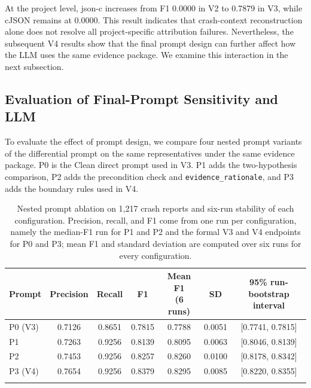 \documentclass[pdflatex,sn-basic]{sn-jnl}%
\renewcommand{\arraystretch}{1.16}%
\theoremstyle{thmstyleone}%
\theoremstyle{thmstyletwo}%
\theoremstyle{thmstylethree}%
\begin{document}
At the project level, {\color{blue}json-c increases from F1 0.0000 in V2 to 0.7879 in V3, while cJSON remains at 0.0000}. This result indicates that crash-context reconstruction alone does not resolve all project-specific attribution failures. Nevertheless, the subsequent V4 results show that the final prompt design can further affect how the LLM uses the same evidence package. We examine this interaction in the next subsection.
\subsection{Evaluation of Final-Prompt Sensitivity and LLM}
\label{subsec:rq4-sensitivity}

To evaluate the effect of prompt design, we compare {\color{blue}four nested prompt variants of the differential prompt on the same representatives} under the same evidence package. {\color{blue}P0 is the Clean direct prompt used in V3. P1 adds the two-hypothesis comparison, P2 adds the precondition check and \texttt{evidence\_rationale}, and P3 adds the boundary rules used in V4.}

\begin{table}[!htbp]
\caption{{\color{blue}Nested prompt ablation on 1,217 crash reports and six-run stability of each configuration. Precision, recall, and F1 come from one run per configuration, namely the median-F1 run for P1 and P2 and the formal V3 and V4 endpoints for P0 and P3; mean F1 and standard deviation are computed over six runs for every configuration.}}
\label{tab:prompt-form-ablation}
\centering
\color{blue}
\scriptsize
\setlength{\tabcolsep}{2.4pt}
\renewcommand{\arraystretch}{1.12}
\begin{tabular*}{\linewidth}{@{\extracolsep{\fill}}lcccccc}
\toprule
Prompt & Precision & Recall & F1 & \makecell{Mean F1\\(6 runs)} & SD & \makecell{95\% run-bootstrap\\interval} \\
\midrule
P0 (V3) & 0.7126 & 0.8651 & 0.7815 & 0.7788 & 0.0051 & [0.7741, 0.7815] \\
P1 & 0.7263 & 0.9256 & 0.8139 & 0.8095 & 0.0063 & [0.8046, 0.8139] \\
P2 & 0.7453 & 0.9256 & 0.8257 & 0.8260 & 0.0100 & [0.8178, 0.8342] \\
P3 (V4) & 0.7654 & 0.9256 & 0.8379 & 0.8295 & 0.0085 & [0.8220, 0.8355] \\
\botrule
\end{tabular*}
\end{table}
\end{document}
